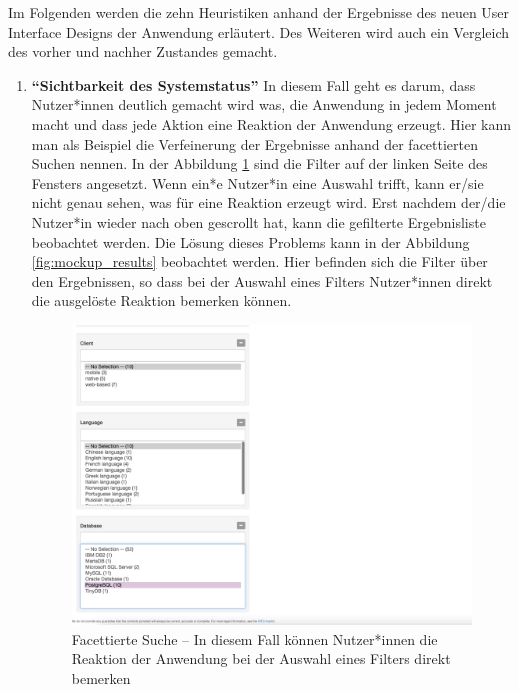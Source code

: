 Im Folgenden werden die zehn Heuristiken anhand der Ergebnisse des neuen User Interface Designs der Anwendung erläutert.
Des Weiteren wird auch ein Vergleich des vorher und nachher Zustandes gemacht.

\begin{enumerate}


\item \textbf{\enquote{Sichtbarkeit des Systemstatus}} \newline
In diesem Fall geht es darum, dass Nutzer*innen deutlich gemacht wird was, die Anwendung in jedem Moment macht und dass jede Aktion eine Reaktion der Anwendung erzeugt.
Hier kann man als Beispiel die Verfeinerung der Ergebnisse anhand der facettierten Suchen nennen.
In der Abbildung \ref{fig:point1_before} sind die Filter auf der linken Seite des Fensters angesetzt.
Wenn ein*e Nutzer*in eine Auswahl trifft, kann er/sie nicht genau sehen, was für eine Reaktion erzeugt wird.
Erst nachdem der/die Nutzer*in wieder nach oben gescrollt hat, kann die gefilterte Ergebnisliste beobachtet werden.
Die Lösung dieses Problems kann in der Abbildung \ref{fig:mockup_results} beobachtet werden.
Hier befinden sich die Filter über den Ergebnissen, so dass bei der Auswahl eines Filters Nutzer*innen direkt die ausgelöste Reaktion bemerken können.

\begin{figure}[H]
	\centering
    	\includegraphics[width=\textwidth]{Images/Punkt_1_davor}
   	\caption[Facettierte Suche]{Facettierte Suche -- In diesem Fall können Nutzer*innen die Reaktion der Anwendung bei der Auswahl eines Filters direkt bemerken}
   	\label{fig:point1_before}
\end{figure}


\end{enumerate}
